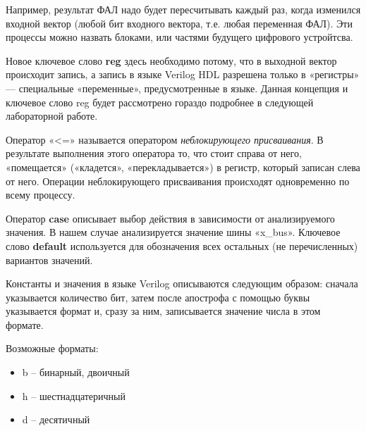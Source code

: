 \documentclass[a5paper, DIV=14, headings=openany, twoside=true,fontsize=10pt, titlepage]{scrreprt}
\newcommand{\quotes}[1]{«#1»}
\newcommand{\eng}[1]{\foreignlanguage{english}{#1}}
\newcommand{\qeng}[1]{\quotes{\foreignlanguage{english}{#1}}}
\begin{document}
\par{Например, результат ФАЛ надо будет пересчитывать каждый раз, когда изменился входной вектор (любой бит входного вектора, т.е. любая переменная ФАЛ). Эти процессы можно назвать блоками, или частями будущего цифрового устройтсва.}

\par{Новое ключевое слово \eng{\textbf{reg}} здесь необходимо потому, что в выходной вектор происходит запись, а запись в языке \eng{Verilog HDL} разрешена только в «регистры» — специальные «переменные», предусмотренные в языке. Данная концепция и ключевое слово reg будет рассмотрено гораздо подробнее в следующей лабораторной работе.}

\par{Оператор \quotes{<=} называется оператором \emph{неблокирующего присваивания}. В результате выполнения этого оператора то, что стоит справа от него, «помещается» («кладется», «перекладывается») в регистр, который записан слева от него. Операции неблокирующего присваивания происходят одновременно по всему процессу.}

\par{Оператор \eng{\textbf{case}} описывает выбор действия в зависимости от анализируемого значения. В нашем случае анализируется значение шины \qeng{x\_bus}. Ключевое слово \eng{\textbf{default}} используется для обозначения всех остальных (не перечисленных) вариантов значений.}


\par{Константы и значения в языке Verilog описываются следующим образом: сначала указывается количество бит, затем после апострофа с помощью буквы указывается формат и, сразу за ним, записывается значение числа в этом формате.}

\begin{minipage}{\textwidth}
\par{Возможные форматы:
\begin{itemize}[noitemsep,topsep=0pt]
  \item b – бинарный, двоичный
  \item h – шестнадцатеричный
  \item d – десятичный
\end{itemize}}
\end{minipage}
\end{document}
